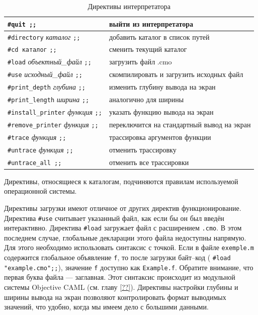 \begin{table}
	\begin{tabular}{|l|l|}
	\hline
	\texttt{\#quit ;;} & выйти из интерпретатора \\
	\hline
	\texttt{\#directory} {\it каталог} \texttt{;;} & добавить каталог в список
путей \\
	\hline
	\texttt{\#cd каталог} \texttt{;;} & сменить текущий каталог \\
	\hline
	\texttt{\#load} {\it объектный\_файл} \texttt{;;} & загрузить файл .cmo \\
	\hline
	\texttt{\#use} {\it исходный\_файл} \texttt{;;} & скомпилировать и загрузить
исходных файл \\
	\hline
	\texttt{\#print\_depth} {\it глубина} \texttt{;;} & изменить глубину вывода
на экран \\
	\hline
	\texttt{\#print\_length} {\it ширина} \texttt{;;} & аналогично для ширины \\
	\hline
	\texttt{\#install\_printer} {\it функция} \texttt{;;} & указать функцию
вывода на экран \\
	\hline
	\texttt{\#remove\_printer} {\it функция} \texttt{;;} & переключится на
стандартный вывод на экран \\
	\hline
	\texttt{\#trace} {\it функция} \texttt{;;} & трассировка аргументов функции
\\
	\hline
	\texttt{\#untrace} {\it функция} \texttt{;;} & отменить трассировку \\
	\hline
	\texttt{\#untrace\_all ;;} & отменить все трассировки \\
	\hline
	\end{tabular}
	\caption{\label{tbl:toplevel_loop_directives}Директивы интерпретатора}
\end{table}

Директивы, относящиеся к каталогам, подчиняются правилам используемой
операционной системы.

Директивы загрузки имеют отличное от других директив функционирование. Директива
\texttt{\#use} считывает указанный файл, как если бы он был введён интерактивно.
Директива \texttt{\#load} загружает файл с расширением \texttt{.cmo}. В этом
последнем случае, глобальные декларации этого файла недоступны напрямую. Для
этого необходимо использовать синтаксис с точкой. Если в файле
\texttt{exemple.m} содержится глобальное объявление \texttt{f}, то после
загрузки байт--код ( \texttt{\#load "example.cmo";;}), значение \texttt{f}
доступно как \texttt{Example.f}. Обратите внимание, что первая буква файла ---
заглавная. Этот синтаксис происходит из модульной системы Objective CAML (см.
главу \ref{??}). Директивы настройки глубины и ширины вывода на экран позволяют
контролировать формат выводимых значений, что удобно, когда мы имеем дело с
большими данными.

